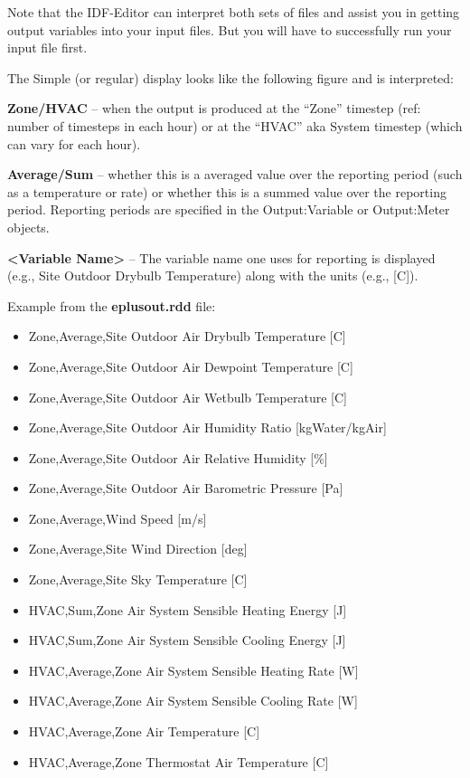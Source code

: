 Note that the IDF-Editor can interpret both sets of files and assist you in getting output variables into your input files. But you will have to successfully run your input file first.

The Simple (or regular) display looks like the following figure and is interpreted:

\textbf{Zone/HVAC} -- when the output is produced at the ``Zone'' timestep (ref: number of timesteps in each hour) or at the ``HVAC'' aka System timestep (which can vary for each hour).

\textbf{Average/Sum} -- whether this is a averaged value over the reporting period (such as a temperature or rate) or whether this is a summed value over the reporting period. Reporting periods are specified in the Output:Variable or Output:Meter objects.

\textbf{\textless{}Variable Name\textgreater{}} -- The variable name one uses for reporting is displayed (e.g., Site Outdoor Drybulb Temperature) along with the units (e.g., {[}C{]}).

Example from the \textbf{eplusout.rdd} file:

\begin{itemize}
\item
  Zone,Average,Site Outdoor Air Drybulb Temperature {[}C{]}
\item
  Zone,Average,Site Outdoor Air Dewpoint Temperature {[}C{]}
\item
  Zone,Average,Site Outdoor Air Wetbulb Temperature {[}C{]}
\item
  Zone,Average,Site Outdoor Air Humidity Ratio {[}kgWater/kgAir{]}
\item
  Zone,Average,Site Outdoor Air Relative Humidity {[}\%{]}
\item
  Zone,Average,Site Outdoor Air Barometric Pressure {[}Pa{]}
\item
  Zone,Average,Wind Speed {[}m/s{]}
\item
  Zone,Average,Site Wind Direction {[}deg{]}
\item
  Zone,Average,Site Sky Temperature {[}C{]}
\item
  HVAC,Sum,Zone Air System Sensible Heating Energy {[}J{]}
\item
  HVAC,Sum,Zone Air System Sensible Cooling Energy {[}J{]}
\item
  HVAC,Average,Zone Air System Sensible Heating Rate {[}W{]}
\item
  HVAC,Average,Zone Air System Sensible Cooling Rate {[}W{]}
\item
  HVAC,Average,Zone Air Temperature {[}C{]}
\item
  HVAC,Average,Zone Thermostat Air Temperature {[}C{]}
\end{itemize}

